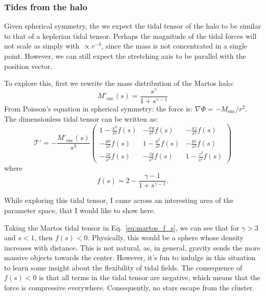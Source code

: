         \subsubsection{Tides from the halo}

            Given spherical symmetry, the we expect the tidal tensor of the halo to be similar to that of a keplerian tidal tensor. Perhaps the magnitude of the tidal forces will not scale as simply with $\propto r^{-3}$, since the mass is not concentrated in a single point. However, we can still expect the stretching axis to be parallel with the position vector. 
            
            To explore this, first we rewrite the mass distribution of the Martos halo:
            \begin{equation}
                M'_\text{enc}(s) = \frac{s^\gamma}{1+s^{\gamma-1}}
            \end{equation}
            From Poisson's equation in spherical symmetry: the force is: $\nabla \Phi = - M_\mathrm{enc}/r^2$. The dimensionless tidal tensor can be written as: 
            \begin{equation}
                \mathcal{T'}= -\frac{M'_\text{enc}(s)}{s^3}\left(\begin{matrix}
                    1-\frac{x^2}{s^2}f(s) & -\frac{xy}{s^2}f(s) & -\frac{xz}{s^2}f(s) \\
                    -\frac{yx}{s^2}f(s) & 1-\frac{y^2}{s^2}f(s) & -\frac{yz}{s^2}f(s) \\
                    -\frac{zx}{s^2}f(s) & -\frac{zy}{s^2}f(s) & 1-\frac{z^2}{s^2}f(s)
                \end{matrix}\right)
            \end{equation}  
            where 
            \begin{equation}
                f(s) = 2-\frac{\gamma-1}{1+s^{\gamma-1}}.
                \label{eq:martos_f_s}
            \end{equation}

            While exploring this tidal tensor, I came across an interesting area of the parameter space, that I would like to show here. 

            Taking the Martos tidal tensor in Eq.~\ref{eq:martos_f_s}, we can see that for $\gamma > 3$ and $s <  1$, then $f(s)< 0$. Physically, this would be a sphere whose density increases with distance. This is not natural, as, in general, gravity sends the more massive objects towards the center. However, it's fun to indulge in this situation to learn some insight about the flexibility of tidal fields. The consequence of $f(s)< 0$ is that all terms in the tidal tensor are negative, which means that the force is compressive everywhere. Consequently, no stars escape from the cluster. 

